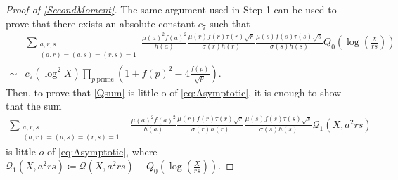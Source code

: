 \documentclass[10pt,a4paper]{amsart}
\def\CalQ{{\mathcal{Q}}}
\theoremstyle{plain}
\theoremstyle{definition}
\theoremstyle{remark}
\begin{document}
\begin{proof}[Proof of \cref{SecondMoment}]
The same argument used in Step 1 can be used to prove that there exists an absolute constant $c_7$ such that
\begin{equation} \label{eq:Q0_estimate}
    \begin{aligned}
        &\sum_{\substack{a,r,s\\(a,r)=(a,s)=(r,s)=1}}
\frac{\mu(a)^2f(a)^2}{h(a)}\frac{\mu(r)f(r)\tau(r)\sqrt{r}}{\sigma(r)h(r)}\frac{\mu(s)f(s)\tau(s)\sqrt{s}}{\sigma(s)h(s)}Q_0\left(\log\left(\frac{X}{rs}\right)\right) \\ \sim &c_7 (\log^2 X)\prod_{p \ \text{prime}}\left(1+f(p)^2-4\frac{f(p)}{\sqrt{p}}\right).
    \end{aligned}
\end{equation}
Then, to prove that \eqref{Qsum} is little-o of \eqref{eq:Asymptotic}, it is enough to show that the sum 
\begin{align}\label{Q1sum}
\sum_{\substack{a,r,s \\(a,r)=(a,s)=(r,s)=1}}
&\frac{\mu(a)^2f(a)^2}{h(a)}\frac{\mu(r)f(r)\tau(r)\sqrt{r}}{\sigma(r)h(r)}\frac{\mu(s)f(s)\tau(s)\sqrt{s}}{\sigma(s)h(s)}\CalQ_1(X,a^2rs) 
\end{align}
is little-$o$ of \eqref{eq:Asymptotic}, where $\CalQ_1(X,a^2rs)\coloneq \CalQ(X,a^2rs)-Q_0(\log(\frac{X}{rs}))$.


\end{proof}
\end{document}
